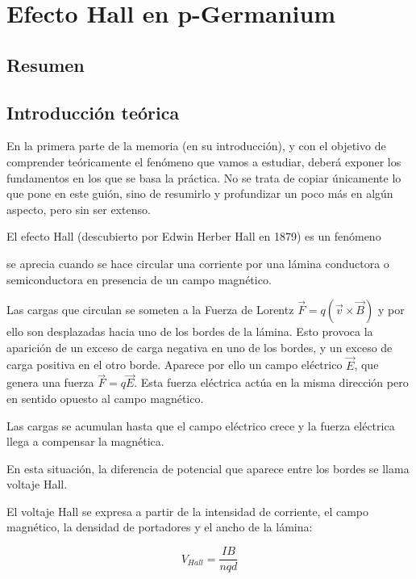 




\chapter{Efecto Hall en p-Germanium}

\section{Resumen}




\section{Introducción teórica}


En la primera parte de la memoria (en su introducción), y con el objetivo de comprender teóricamente el fenómeno que vamos a estudiar, deberá exponer los fundamentos en los que se basa la práctica. No se trata de copiar únicamente lo que pone en este guión, sino de resumirlo y profundizar un poco más en algún aspecto, pero sin ser extenso.


\vspace{3\baselineskip}

El efecto Hall (descubierto por Edwin Herber Hall en 1879) es un fenómeno 

se aprecia cuando se hace circular una corriente por una lámina conductora o semiconductora en presencia de un campo magnético. 

Las cargas que circulan se someten a la Fuerza de Lorentz $\vec{F} = q(\vec{v} \times \vec{B})$ y por ello son desplazadas hacia uno de los bordes de la lámina. Esto provoca la aparición de un exceso de carga negativa en uno de los bordes, y un exceso de carga positiva en el otro borde. Aparece por ello un campo eléctrico $\vec{E}$, que genera una fuerza $\vec{F}= q \vec{E}$. Esta fuerza eléctrica actúa en la misma dirección pero en sentido opuesto al campo magnético. 

Las cargas se acumulan hasta que el campo eléctrico crece y la fuerza eléctrica llega a compensar la magnética. 

En esta situación, la diferencia de potencial que aparece entre los bordes se llama voltaje Hall. 

El voltaje Hall se expresa a partir de la intensidad de corriente, el campo magnético, la densidad de portadores y el ancho de la lámina:


\[ V_{Hall} = \frac{I B}{nqd}
\]


